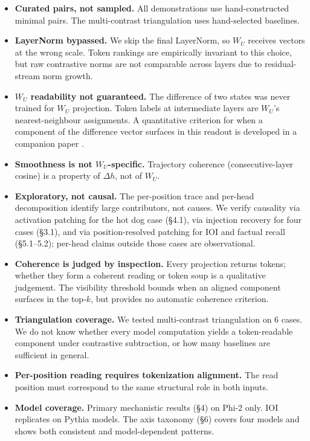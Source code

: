 \documentclass[11pt]{article}
\newcommand{\dhh}{\Delta h}
\newcommand{\WU}{W_U}
\begin{document}
\begin{itemize}[leftmargin=*]
\item \textbf{Curated pairs, not sampled.} All demonstrations use hand-constructed
  minimal pairs. The multi-contrast triangulation uses hand-selected
  baselines.
\item \textbf{LayerNorm bypassed.} We skip the final LayerNorm, so $\WU$ receives
  vectors at the wrong scale. Token rankings are empirically invariant to
  this choice, but raw contrastive norms are not comparable across layers
  due to residual-stream norm growth.
\item \textbf{$\WU$ readability not guaranteed.} The difference of two states was
  never trained for $\WU$ projection. Token labels at intermediate layers
  are $\WU$'s nearest-neighbour assignments. A quantitative criterion for
  when a component of the difference vector surfaces in this readout is
  developed in a companion paper \citep{tuomi2026visibility}.
\item \textbf{Smoothness is not $\WU$-specific.} Trajectory coherence
  (consecutive-layer cosine) is a property of $\dhh$, not of $\WU$.
\item \textbf{Exploratory, not causal.} The per-position trace and per-head
  decomposition identify large contributors, not causes. We verify
  causality via activation patching for the hot dog case (\S4.1), via
  injection recovery for four cases (\S3.1), and via position-resolved
  patching for IOI and factual recall (\S5.1--5.2); per-head claims
  outside those cases are observational.
\item \textbf{Coherence is judged by inspection.} Every projection returns
  tokens; whether they form a coherent reading or token soup is a
  qualitative judgement. The visibility threshold
  \citep{tuomi2026visibility} bounds when an aligned component surfaces
  in the top-$k$, but provides no automatic coherence criterion.
\item \textbf{Triangulation coverage.} We tested multi-contrast triangulation on
  6 cases. We do not know whether every model computation yields a
  token-readable component under contrastive subtraction, or how many
  baselines are sufficient in general.
\item \textbf{Per-position reading requires tokenization alignment.} The read
  position must correspond to the same structural role in both inputs.
\item \textbf{Model coverage.} Primary mechanistic results (\S4) on Phi-2 only.
  IOI replicates on Pythia models. The axis taxonomy (\S6) covers four
  models and shows both consistent and model-dependent patterns.
\end{itemize}
\end{document}
